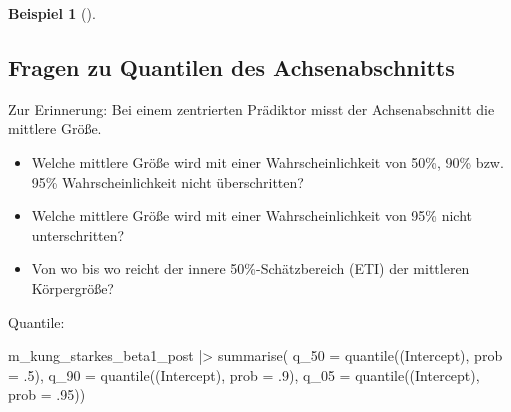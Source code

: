 \documentclass[
  ngerman,
  letterpaper,
  twoside,
  open=any]{scrbook}
\newenvironment{Shaded}{\begin{snugshade}}{\end{snugshade}}
\newcommand{\AttributeTok}[1]{\textcolor[rgb]{0.40,0.45,0.13}{#1}}
\newcommand{\DecValTok}[1]{\textcolor[rgb]{0.68,0.00,0.00}{#1}}
\newcommand{\FunctionTok}[1]{\textcolor[rgb]{0.28,0.35,0.67}{#1}}
\newcommand{\NormalTok}[1]{\textcolor[rgb]{0.00,0.23,0.31}{#1}}
\newcommand{\SpecialCharTok}[1]{\textcolor[rgb]{0.37,0.37,0.37}{#1}}
\newcommand{\StringTok}[1]{\textcolor[rgb]{0.13,0.47,0.30}{#1}}
\providecommand{\tightlist}{%
  \setlength{\itemsep}{0pt}\setlength{\parskip}{0pt}}\usepackage{longtable,booktabs,array}
\theoremstyle{definition}
\newtheorem{example}{Beispiel}[chapter]
\theoremstyle{plain}
\theoremstyle{definition}
\theoremstyle{definition}
\theoremstyle{remark}
\begin{document}
\begin{example}[]
\begin{figure}[H]
\end{figure}%

\subsection{Fragen zu Quantilen des
Achsenabschnitts}\label{fragen-zu-quantilen-des-achsenabschnitts}

\begin{tcolorbox}[enhanced jigsaw, arc=.35mm, bottomrule=.15mm, bottomtitle=1mm, breakable, colback=white, colbacktitle=quarto-callout-note-color!10!white, colframe=quarto-callout-note-color-frame, coltitle=black, left=2mm, leftrule=.75mm, opacityback=0, opacitybacktitle=0.6, rightrule=.15mm, title=\textcolor{quarto-callout-note-color}{\faInfo}\hspace{0.5em}{Hinweis}, titlerule=0mm, toprule=.15mm, toptitle=1mm]

Zur Erinnerung: Bei einem zentrierten Prädiktor misst der
Achsenabschnitt die mittlere Größe\footnotemark{}.

\end{tcolorbox}

\footnotetext{\(\mu\)}

\begin{itemize}
\tightlist
\item
  Welche mittlere Größe wird mit einer Wahrscheinlichkeit von 50\%, 90\%
  bzw. 95\% Wahrscheinlichkeit nicht überschritten?
\item
  Welche mittlere Größe wird mit einer Wahrscheinlichkeit von 95\% nicht
  unterschritten?
\item
  Von wo bis wo reicht der innere 50\%-Schätzbereich (ETI) der mittleren
  Körpergröße?
\end{itemize}

Quantile:

\begin{Shaded}
\begin{Highlighting}[]
\NormalTok{m\_kung\_starkes\_beta1\_post }\SpecialCharTok{|\textgreater{}} 
  \FunctionTok{summarise}\NormalTok{(}
    \AttributeTok{q\_50 =} \FunctionTok{quantile}\NormalTok{(}\StringTok{\textasciigrave{}}\AttributeTok{(Intercept)}\StringTok{\textasciigrave{}}\NormalTok{, }\AttributeTok{prob =}\NormalTok{ .}\DecValTok{5}\NormalTok{),}
    \AttributeTok{q\_90 =} \FunctionTok{quantile}\NormalTok{(}\StringTok{\textasciigrave{}}\AttributeTok{(Intercept)}\StringTok{\textasciigrave{}}\NormalTok{, }\AttributeTok{prob =}\NormalTok{ .}\DecValTok{9}\NormalTok{),}
    \AttributeTok{q\_05 =} \FunctionTok{quantile}\NormalTok{(}\StringTok{\textasciigrave{}}\AttributeTok{(Intercept)}\StringTok{\textasciigrave{}}\NormalTok{, }\AttributeTok{prob =}\NormalTok{ .}\DecValTok{95}\NormalTok{))}
\end{Highlighting}
\end{Shaded}


\end{example}
\end{document}
